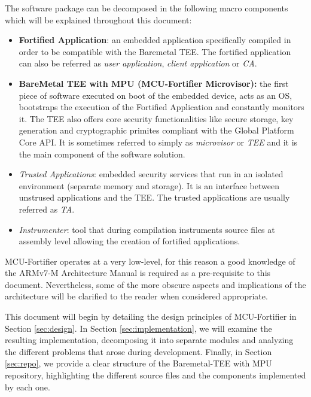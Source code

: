 \documentclass{article}
\begin{document}
The software package can be decomposed in the following macro components which will be explained throughout this document:
\begin{itemize}
	\item \textbf{Fortified Application}: an embedded application specifically compiled in order to be compatible with the Baremetal TEE. The fortified application can also be referred as \textit{user application}, \textit{client application} or \textit{CA}.
	\item \textbf{BareMetal TEE with MPU (MCU-Fortifier Microvisor):} the first piece of software executed on boot of the embedded device, acts as an OS, bootstraps the execution of the Fortified Application and constantly monitors it. The TEE also offers core security functionalities like secure storage, key generation and cryptographic primites compliant with the Global Platform Core API. It is sometimes referred to simply as \textit{microvisor} or \textit{TEE} and it is the main component of the software solution.
        \item \textit{Trusted Applications}:  embedded security services that run in an isolated environment (separate memory and storage). It is an interface between unstrused applications and the TEE. The trusted applications are usually referred as \textit{TA}.
	\item \textit{Instrumenter}: tool that during compilation instruments source files at assembly level allowing the creation of fortified applications.
\end{itemize}

MCU-Fortifier operates at a very low-level, for this reason a good knowledge of the ARMv7-M Architecture Manual\cite{armv7m} is required as a pre-requisite to this document. Nevertheless, some of the more obscure aspects and implications of the architecture will be clarified to the reader when considered appropriate.

This document will begin by detailing the design principles of MCU-Fortifier in Section \ref{sec:design}. In Section \ref{sec:implementation}, we will examine the resulting implementation, decomposing it into separate modules and analyzing the different problems that arose during development. Finally, in Section \ref{sec:repo}, we provide a clear structure of the Baremetal-TEE with MPU repository, highlighting the different source files and the components implemented by each one.
\end{document}
